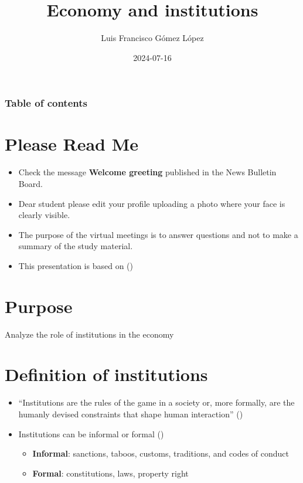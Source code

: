 \documentclass[
  ignorenonframetext,
]{beamer}
\title{Economy and institutions}
\author{Luis Francisco Gómez López}
\date{2024-07-16}
\institute{FAEDIS}
\renewcommand*\contentsname{Table of contents}
\newcommand\contentsname{Table of contents}
\begin{document}
\frame{\titlepage}

\renewcommand*\contentsname{Table of contents}
\begin{frame}[allowframebreaks]
  \frametitle{Table of contents}
  \tableofcontents[hideallsubsections]
\end{frame}

\section{Please Read Me}\label{please-read-me}

\begin{frame}{}
\label{section}
\begin{itemize}
\item
  Check the message \textbf{Welcome greeting} published in the News
  Bulletin Board.
\item
  Dear student please edit your profile uploading a photo where your
  face is clearly visible.
\item
  The purpose of the virtual meetings is to answer questions and not to
  make a summary of the study material.
\item
  This presentation is based on
  ()
\end{itemize}
\end{frame}

\section{Purpose}\label{purpose}

\begin{frame}{}
\label{section-1}
Analyze the role of institutions in the economy
\end{frame}

\section{Definition of institutions}\label{definition-of-institutions}

\begin{frame}{}
\label{section-2}
\begin{itemize}
\item
  ``Institutions are the rules of the game in a society or, more
  formally, are the humanly devised constraints that shape human
  interaction'' ()
\item
  Institutions can be informal or formal
  ()

  \begin{itemize}
  \item
    \textbf{Informal}: sanctions, taboos, customs, traditions, and codes
    of conduct
  \item
    \textbf{Formal}: constitutions, laws, property right
  \end{itemize}
\end{itemize}
\end{frame}
\end{document}
